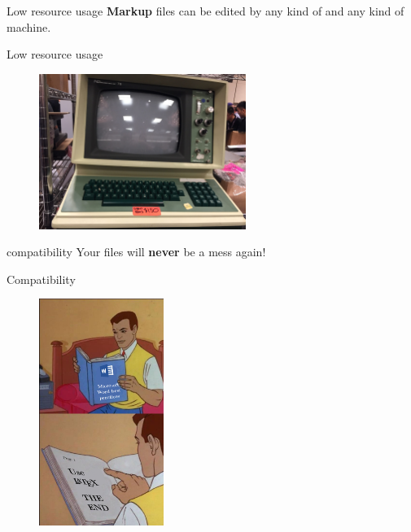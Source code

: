 \documentclass[compress]{beamer}
\begin{document}
\begin{frame}{Low resource usage}
    \textbf{Markup} files can be edited by any kind of  and any kind of machine.
\end{frame}
\begin{frame}{Low resource usage}
    \begin{figure}
        \centering
        \includegraphics[width=0.6\textwidth]{img/BadPC.jpeg}
    \end{figure}
\end{frame}

\begin{frame}{compatibility}
   Your files will \textbf{never} be a mess again! 
\end{frame}
\begin{frame}{Compatibility}
\begin{figure}
    \centering
    \includegraphics[width=0.36\textwidth]{img/WindowsMeme.png}
\end{figure}
\end{frame}
\end{document}
